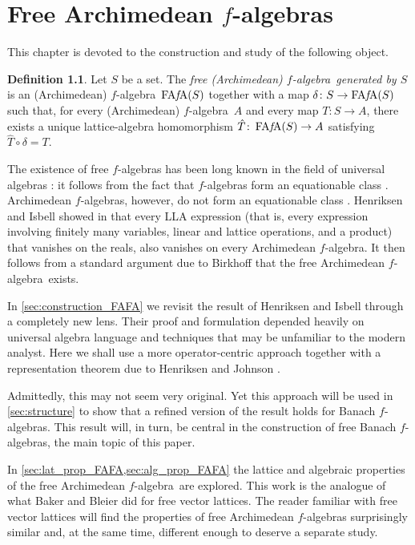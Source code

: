 \documentclass{memo-l}
\theoremstyle{definition}
\newtheorem{defn}[theorem]{Definition}
\theoremstyle{remark}
\numberwithin{section}{chapter}
\numberwithin{equation}{chapter}
\newcommand{\falg}{$f\!$-algebra}
\newcommand{\FAFA}[1]{\operatorname{FA{\it f}\!A}(#1)}
\begin{document}
\chapter{Free Archimedean \texorpdfstring{$f$-algebras}{f-algebras}}
\label{sec:archimedean}

This chapter is devoted to the construction and study of the following
object.

\begin{defn}
    Let $S$ be a set. The \emph{free (Archimedean) \falg\ generated
    by $S$} is an (Archimedean) \falg\ $\FAFA S$ together with a map
    $\delta \colon S\to \FAFA S$ such that, for every
    (Archimedean)
    \falg\ $A$ and every map $T\colon S\to A$, there exists a
    unique lattice-algebra homomorphism $\hat{T}\colon \FAFA S\to A$
    satisfying $\hat T \circ \delta =T$.
\end{defn}

The existence of free \falg s has been long known in the field of
universal algebras \cite[Section 5.2]{keimel1995}: it follows from the fact that \falg s form an
equationable class \cite[Theorem VII.8]{birkhoff1967}. Archimedean
\falg s, however, do not form an equationable class \cite[Section 8]{de_jeu2021}.
Henriksen and Isbell showed in
\cite{henriksen_isbell1962} that every LLA expression (that
is, every expression involving finitely many variables, linear and
lattice operations, and a product) that vanishes on the reals, also
vanishes on every Archimedean \falg. It then follows from a standard argument due to
Birkhoff \cite{birkhoff1935} that the free
Archimedean \falg\ exists.

In \cref{sec:construction_FAFA} we revisit the result of Henriksen and Isbell through
a completely new lens. Their proof and formulation depended heavily on
universal algebra language and techniques that may be unfamiliar to
the modern analyst. Here we shall use a more operator-centric
approach together with a representation theorem
due to Henriksen and Johnson \cite{henriksen_johnson1961}.

Admittedly, this may not seem very original. Yet this approach will be
used in \cref{sec:structure} to show that a refined version of the
result holds for Banach \falg s. This result will, in turn, be central
in the construction of free Banach \falg s, the main topic of this
paper.

In \cref{sec:lat_prop_FAFA,sec:alg_prop_FAFA} the lattice and algebraic
properties of the free Archimedean \falg\ are explored. This work is
the analogue of what Baker \cite{baker1968} and Bleier
\cite{bleier1973} did for free vector lattices.
The reader familiar with free vector lattices
will find the properties of free Archimedean
\falg s surprisingly similar and, at the same time, different enough
to deserve a separate study.
\end{document}
